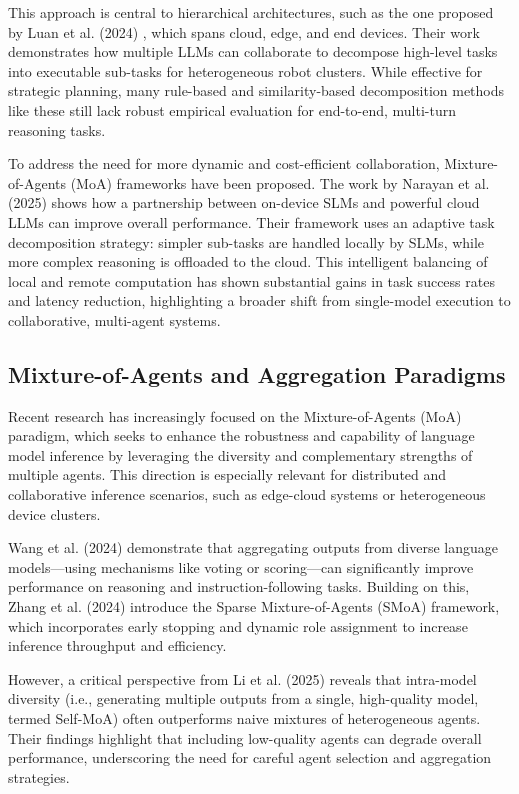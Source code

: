 This approach is central to hierarchical architectures, such as the one proposed by Luan et al. (2024) \cite{Luan2024Hierarchical}, which spans cloud, edge, and end devices. Their work demonstrates how multiple LLMs can collaborate to decompose high-level tasks into executable sub-tasks for heterogeneous robot clusters. While effective for strategic planning, many rule-based and similarity-based decomposition methods like these still lack robust empirical evaluation for end-to-end, multi-turn reasoning tasks.

To address the need for more dynamic and cost-efficient collaboration, Mixture-of-Agents (MoA) frameworks have been proposed. The work by Narayan et al. (2025) \cite{Narayan2025Minions} shows how a partnership between on-device SLMs and powerful cloud LLMs can improve overall performance. Their framework uses an adaptive task decomposition strategy: simpler sub-tasks are handled locally by SLMs, while more complex reasoning is offloaded to the cloud. This intelligent balancing of local and remote computation has shown substantial gains in task success rates and latency reduction, highlighting a broader shift from single-model execution to collaborative, multi-agent systems.

\subsection{Mixture-of-Agents and Aggregation Paradigms}
Recent research has increasingly focused on the Mixture-of-Agents (MoA) paradigm, which seeks to enhance the robustness and capability of language model inference by leveraging the diversity and complementary strengths of multiple agents. This direction is especially relevant for distributed and collaborative inference scenarios, such as edge-cloud systems or heterogeneous device clusters.

Wang et al. (2024) \cite{Wang2024MoA} demonstrate that aggregating outputs from diverse language models—using mechanisms like voting or scoring—can significantly improve performance on reasoning and instruction-following tasks. Building on this, Zhang et al. (2024) \cite{Zhang2024SMoA} introduce the Sparse Mixture-of-Agents (SMoA) framework, which incorporates early stopping and dynamic role assignment to increase inference throughput and efficiency.

However, a critical perspective from Li et al. (2025) \cite{Li2025RethinkingMoA} reveals that intra-model diversity (i.e., generating multiple outputs from a single, high-quality model, termed Self-MoA) often outperforms naive mixtures of heterogeneous agents. Their findings highlight that including low-quality agents can degrade overall performance, underscoring the need for careful agent selection and aggregation strategies.

